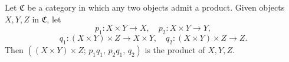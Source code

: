 Let $\mathfrak{C}$ be a category in which any two objects admit a product. Given objects $X, Y, Z$ in $\mathfrak{C}$, let
$$p_1: X \times Y \to X, \quad p_2: X \times Y \to Y,$$
$$q_1: (X \times Y) \times Z \to X \times Y, \quad q_2: (X \times Y) \times Z \to Z.$$
Then $((X \times Y) \times Z;\, p_1 q_1,\, p_2 q_1,\, q_2)$ is the product of $X, Y, Z$.
